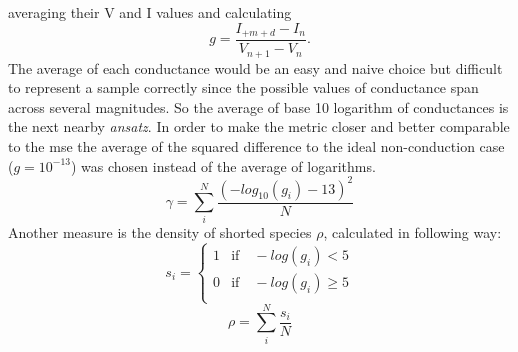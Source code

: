 averaging their V and I values and calculating
\begin{equation}
    g = \frac{I_{+m+d} - I_n}{V_{n+1} - V_n}.
\end{equation}
%
The average of each conductance would be an easy and naive choice but difficult to represent a 
sample correctly since the possible values of conductance span across several magnitudes.
So the average of base 10 logarithm of conductances is the next nearby \textit{ansatz}.
%
In order to make the metric closer and better comparable to the \gls{mse} the average of the squared difference 
to the ideal non-conduction case ($g=10^{-13}$) was chosen instead of the average of logarithms. 
%
\begin{equation}
    \gamma = \sum_i^N \frac{ (-log_{10}(g_i) - 13)^2}{N}
	\label{eq:gamma}
\end{equation}
Another measure is the density of shorted species $\rho$, calculated in following way:
\begin{equation}
	s_i = \begin{cases}
	1 &\text{if} \quad -log(g_i) < 5 \\
	0 &\text{if} \quad -log(g_i) \geq 5 \\
	\end{cases}
\end{equation}
\begin{equation}
	\rho = \sum_i^N \frac{s_i}{N}
	\label{eq:rho}
\end{equation}
%

